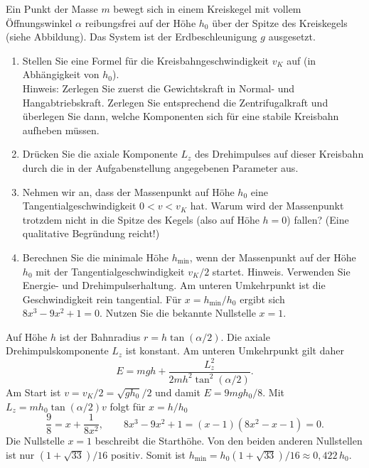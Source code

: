 \begin{ExerciseBlock}
Ein Punkt der Masse $m$ bewegt sich in einem Kreiskegel mit vollem Öffnungswinkel $\alpha$ reibungsfrei auf der
Höhe $h_0$ über der Spitze des Kreiskegels (siehe Abbildung). Das System ist der Erdbeschleunigung
$g$ ausgesetzt.

\begin{center}
\end{center}

\begin{enumerate}
	\item Stellen Sie eine Formel für die Kreisbahngeschwindigkeit $v_K$ auf (in Abhängigkeit von $h_0$). \\
	Hinweis: Zerlegen Sie zuerst die Gewichtskraft in Normal- und Hangabtriebskraft. Zerlegen Sie entsprechend die Zentrifugalkraft und überlegen Sie dann, welche Komponenten sich für eine stabile Kreisbahn aufheben müssen.

	\item Drücken Sie die axiale Komponente $L_z$ des Drehimpulses auf dieser Kreisbahn durch die in der
Aufgabenstellung angegebenen Parameter aus.

	\item Nehmen wir an, dass der Massenpunkt auf Höhe $h_0$ eine Tangentialgeschwindigkeit $0 < v < v_K$ hat. Warum wird der Massenpunkt trotzdem nicht in die Spitze des Kegels (also auf Höhe $h = 0$) fallen? (Eine qualitative Begründung reicht!)

	\item Berechnen Sie die minimale Höhe $h_\mathrm{min}$, wenn der Massenpunkt auf der Höhe $h_0$ mit der Tangentialgeschwindigkeit $v_K/2$ startet.
	Hinweis. Verwenden Sie Energie- und Drehimpulserhaltung. Am unteren Umkehrpunkt ist die Geschwindigkeit rein tangential. Für $x=h_\mathrm{min}/h_0$ ergibt sich $8x^3-9x^2+1=0$. Nutzen Sie die bekannte Nullstelle $x=1$.
\end{enumerate}
\end{ExerciseBlock}
\begin{Solution}
\begin{RemarkBox}[title=Ergänzung zu Teilaufgabe d)]
Auf Höhe $h$ ist der Bahnradius $r=h\tan(\alpha/2)$. Die axiale Drehimpulskomponente $L_z$ ist konstant. Am unteren Umkehrpunkt gilt daher
\[
 E=mgh+\frac{L_z^2}{2m h^2\tan^2(\alpha/2)}.
\]
Am Start ist $v=v_K/2=\sqrt{g h_0}/2$ und damit $E=9mgh_0/8$. Mit $L_z=m h_0\tan(\alpha/2)v$ folgt für $x=h/h_0$
\[
 \frac98=x+\frac{1}{8x^2},
 \qquad
 8x^3-9x^2+1=(x-1)(8x^2-x-1)=0.
\]
Die Nullstelle $x=1$ beschreibt die Starthöhe. Von den beiden anderen Nullstellen ist nur $(1+\sqrt{33})/16$ positiv. Somit ist $h_\mathrm{min}=h_0(1+\sqrt{33})/16\approx 0{,}422\,h_0$.
\end{RemarkBox}
\end{Solution}
